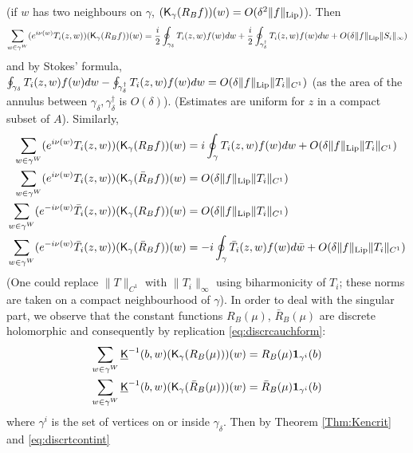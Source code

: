 \documentclass[10pt]{article}
\newcommand{\ind}{{\bf 1}}
\newcommand{\rK}{{\sf K}}
\newcommand{\uK}{{\underline {\sf K}}}
\newcommand{\dg}{\dagger}
\begin{document}
(if $w$ has two neighbours on $\gamma$,  $(\rK_\gamma (R_Bf))(w)=O(\delta^2 \|f\|_{{\rm Lip}})$). Then
$$\sum_{w\in\gamma^W}(e^{i\nu(w)}T_i(z,w))(\rK_\gamma (R_Bf))(w)=\frac i2\oint_{\gamma_\delta} T_i(z,w)f(w)dw
+\frac i2\oint_{\gamma^\dg_\delta} T_i(z,w)f(w)dw
+O(\delta\|f\|_{{\rm Lip}}\|S_i\|_\infty)
$$ 
and by Stokes' formula, $\oint_{\gamma_\delta} T_i(z,w)f(w)dw
-\oint_{\gamma^\dg_\delta} T_i(z,w)f(w)dw=O(\delta\|f\|_{{\rm Lip}}\|T_i\|_{C^1})$ (as the area of the annulus between $\gamma_\delta,\gamma_\delta^\dg$ is $O(\delta)$). (Estimates are uniform for $z$ in a compact subset of $A$). Similarly,
\begin{align*}
\sum_{w\in\gamma^W}(e^{i\nu(w)}T_i(z,w))(\rK_\gamma (R_Bf))(w)&=i\oint_{\gamma} T_i(z,w)f(w)dw+O(\delta\|f\|_{{\rm Lip}}\|T_i\|_{C^1})\\
\sum_{w\in\gamma^W}(e^{i\nu(w)}T_i(z,w))(\rK_\gamma (\bar R_Bf))(w)&=O(\delta\|f\|_{{\rm Lip}}\|T_i\|_{C^1})\\
\sum_{w\in\gamma^W}(e^{-i\nu(w)}\bar T_i(z,w))(\rK_\gamma (R_Bf))(w)&=O(\delta\|f\|_{{\rm Lip}}\|T_i\|_{C^1})\\
\sum_{w\in\gamma^W}(e^{-i\nu(w)}\bar T_i(z,w))(\rK_\gamma (\bar R_Bf))(w)&=-i\oint_{\gamma} \bar T_i(z,w)f(w)d\bar w+O(\delta\|f\|_{{\rm Lip}}\|T_i\|_{C^1})
\end{align*}
(One could replace $\|T\|_{C^1}$ with $\|T_i\|_\infty$ using biharmonicity of $T_i$; these norms are taken on a compact neighbourhood of $\gamma$). 
In order to deal with the singular part, we observe that the constant functions $R_B(\mu)$, $\bar R_B(\mu)$ are discrete holomorphic and consequently by replication \eqref{eq:discrcauchform}:
\begin{align*}
\sum_{w\in\gamma^W}\uK^{-1}(b,w)(\rK_\gamma (R_B(\mu)))(w)&=R_B(\mu)\ind_{\gamma^i}(b)\\
\sum_{w\in\gamma^W}\uK^{-1}(b,w)(\rK_\gamma (\bar R_B(\mu)))(w)&=\bar R_B(\mu)\ind_{\gamma^i}(b)
\end{align*}
 where $\gamma^i$ is the set of vertices on or inside $\gamma_\delta$. Then by Theorem \ref{Thm:Kencrit} and \eqref{eq:discrtcontint}
\end{document}
